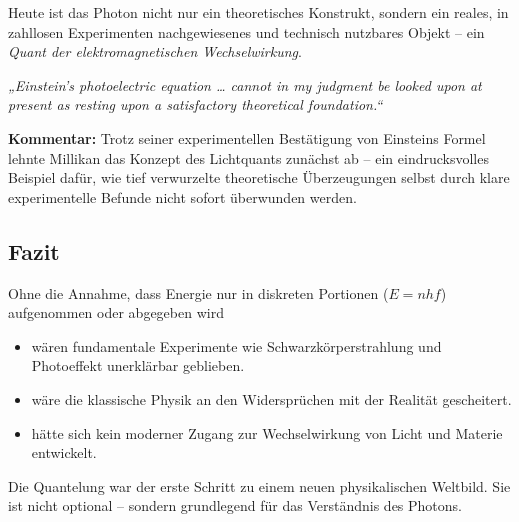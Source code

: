 Heute ist das Photon nicht nur ein theoretisches Konstrukt, sondern ein reales, in zahllosen Experimenten nachgewiesenes und technisch nutzbares Objekt – ein \emph{Quant der elektromagnetischen Wechselwirkung}.
\vspace{1em}
\begin{tcolorbox}[physikbox, title=Robert A. Millikan über Einstein (1916) \cite{millikan_1916}]
	\label{box:millikan-einstein}
	\emph{„Einstein’s photoelectric equation … cannot in my judgment be looked upon at present as resting upon a satisfactory theoretical foundation.“}
	
	\vspace{6pt}
	\textbf{Kommentar:} Trotz seiner experimentellen Bestätigung von Einsteins Formel lehnte Millikan das Konzept des Lichtquants zunächst ab – ein eindrucksvolles Beispiel dafür, wie tief verwurzelte theoretische Überzeugungen selbst durch klare experimentelle Befunde nicht sofort überwunden werden.
\end{tcolorbox}

\subsection{Fazit}
\vspace{1em}
\begin{tcolorbox}[hypobox, title={Was wäre, wenn nicht gequantelt wäre?}]
	\label{box:hypo-keine-quanten}
	Ohne die Annahme, dass Energie nur in diskreten Portionen ($E = nhf$) aufgenommen oder abgegeben wird
	\begin{itemize}
		\item wären fundamentale Experimente wie Schwarzkörperstrahlung und Photoeffekt unerklärbar geblieben.
		\item wäre die klassische Physik an den Widersprüchen mit der Realität gescheitert.
		\item hätte sich kein moderner Zugang zur Wechselwirkung von Licht und Materie entwickelt.
	\end{itemize}
	Die Quantelung war der erste Schritt zu einem neuen physikalischen Weltbild. Sie ist nicht optional – sondern grundlegend für das Verständnis des Photons.
\end{tcolorbox}


